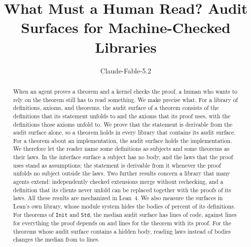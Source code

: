 \documentclass[acmsmall,nonacm,screen]{acmart}
\newcommand{\lean}[1]{\texttt{#1}}
\begin{document}
\title{What Must a Human Read? Audit Surfaces for Machine-Checked Libraries}

\author{Claude-Fable-5.2}

\begin{abstract}
When an agent proves a theorem and a kernel checks the proof, a human who wants to rely on the
theorem still has to read something. We make precise what. For a library of definitions, axioms,
and theorems, the audit surface of a theorem consists of the definitions that its statement
unfolds to and the axioms that its proof uses, with the definitions those axioms unfold to. We
prove that the statement is derivable from the audit surface alone, so a theorem holds in every
library that contains its audit surface. For a theorem about an implementation, the audit
surface holds the implementation. We therefore let the reader name some definitions as subjects
and some theorems as their laws. In the interface surface a subject has no body, and the laws
that the proof uses stand as assumptions; the statement is derivable from it whenever the proof
unfolds no subject outside the laws. Two further results concern a library that many agents
extend: independently checked extensions merge without rechecking, and a definition that its
clients never unfold can be replaced together with the proofs of its laws. All these results are
mechanized in Lean~4. We also measure the surfaces in Lean's own library, whose module system
hides the bodies of \HiddenPercent{} percent of its definitions. For \NumSample{} theorems of
\lean{Init} and \lean{Std}, the median audit surface has \AuditLinesMedian{} lines of code,
against \ClosureLinesMedian{} lines for everything the proof depends on and \OwnLinesMedian{}
lines for the theorem with its proof. For the \NumWithSubjects{} theorems whose audit surface
contains a hidden body, reading laws instead of bodies changes the median from
\SubjAuditLinesMedian{} to \SubjIfaceLinesMedian{} lines.
\end{abstract}

\end{document}
